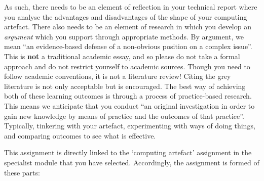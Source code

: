 \documentclass{../../fal_assignment}
\begin{document}
As such, there needs to be an element of reflection in your technical report where you analyse the advantages and disadvantages of the shape of 
your computing artefact. There also needs to be an element of research in which you develop an \textit{argument} which you support through appropriate methods. By argument,
we mean ``an evidence-based defense of a non-obvious position on a complex issue''. This is \textbf{not} a traditional academic essay, and so please do not take a formal approach and do not restrict yourself to academic sources. Though you need to follow academic conventions, it is not a literature review! Citing the grey literature is not only acceptable but is encouraged. The best way of achieving both of these learning outcomes is through a process of practice-based research. This means we anticipate that you conduct ``an original investigation in order to gain new knowledge by means of practice and the outcomes of that practice''. Typically, tinkering with your artefact, experimenting with ways of doing things, and comparing outcomes to see what is effective.

This assignment is directly linked to the `computing artefact' assignment in the specialist module that you have selected. Accordingly, the assignment is formed of these parts:
\end{document}
